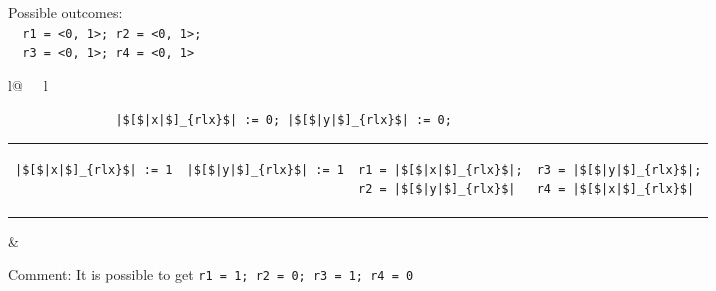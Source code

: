 \begin{minipage}[t]{0.3\linewidth}
Possible outcomes:\\
\lstinline{  r1 = <0, 1>; r2 = <0, 1>;}\\
\lstinline{  r3 = <0, 1>; r4 = <0, 1>}\\
\end{minipage}
%
\begin{minipage}[t]{0.5\linewidth}
\vspace{-.2cm}
  \begin{tabular}{l@{\ \ \ }l}
    \begin{minipage}[l]{4.3cm} \small
\begin{lstlisting}
               |$[$|x|$]_{rlx}$| := 0; |$[$|y|$]_{rlx}$| := 0;
\end{lstlisting}
\vspace{-.2cm}
\begin{tabular}{l||l||l||l}
\begin{lstlisting}
|$[$|x|$]_{rlx}$| := 1
\end{lstlisting}
\hspace{.6cm}
&
\begin{lstlisting}
|$[$|y|$]_{rlx}$| := 1
\end{lstlisting}
\hspace{.6cm}
&
\begin{lstlisting}
r1 = |$[$|x|$]_{rlx}$|;
r2 = |$[$|y|$]_{rlx}$|
\end{lstlisting}
\hspace{.6cm}
&
\begin{lstlisting}
r3 = |$[$|y|$]_{rlx}$|;
r4 = |$[$|x|$]_{rlx}$|
\end{lstlisting}
\end{tabular}
    \end{minipage}
&
  \end{tabular}
\end{minipage}

Comment:
It is possible to get
\lstinline{r1 = 1; r2 = 0; r3 = 1; r4 = 0}
\litmusTestEnd

